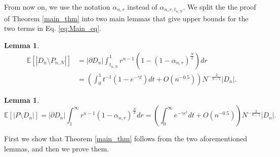 \documentclass[10pt, twoside, leqno]{article}
\newtheorem{lemma}[thm]{Lemma}
\theoremstyle{definition}
\newtheorem{remark}[thm]{Remark}
\numberwithin{equation}{section}
\newcommand{\be}{\begin{equation}}
\newcommand{\ee}{\end{equation}}
\newcommand{\E}{{\mathbb{E}}}
\newcommand{\R}{\mathbb{R}}
\newcommand{\NN}{N^{-\frac 2{n-1} }}
\begin{document}
From now on, we use the notation $ \alpha_{n,r}$ instead of 
$ \alpha_{n,r,t_{n,N}} $.
%	
We split the the proof of Theorem \ref{main_thm} into two main lemmas that give upper bounds for the two terms in Eq. \eqref{eq:Main_eq}.%
\begin{lemma}{\label{firstpartlem}}
	\be\label{Partone}
	\begin{aligned}
		\E[|D_n \setminus P_{n,N}|] &= |\partial D_n|\int_{t_{n,N}}^{1}r^{n-1}\left(1 - \left(1-\alpha_{n,r}\right)^\frac N2\right)dr\\ 
		&= \left(\int_{0}^{1}t^{-1}(1-e^{-\gamma t})dt+O\left(n^{-0.5}\right)\right)N^{-\frac{2}{n-1}}|D_n|.
	\end{aligned}
	\ee
\end{lemma}\begin{lemma}{\label{lemma_2}}
\begin{equation}\label{Parttwo}
\E[|P \setminus D_n|] = |\partial D_n|\int_{1}^{\infty}r^{n-1}\left(1-\alpha_{n,r}\right)^{\frac N2}dr =\left(\int_{0}^{\infty}e^{-\gamma e^{t}}dt+O\left(n^{-0.5}\right)\right)N^{-\frac{2}{n-1}}|D_n|.
\end{equation}
\end{lemma}
First we show that Theorem \ref{main_thm} follows from the two aforementioned lemmas, and then we prove them.
\end{document}
